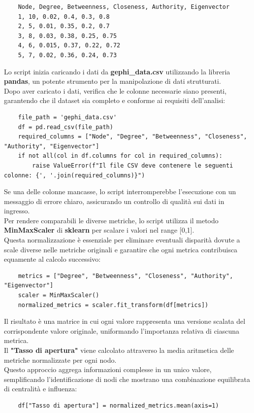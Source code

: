 \documentclass[12pt]{article}
\begin{document}
	\begin{lstlisting}
	Node, Degree, Betweenness, Closeness, Authority, Eigenvector
	1, 10, 0.02, 0.4, 0.3, 0.8
	2, 5, 0.01, 0.35, 0.2, 0.7
	3, 8, 0.03, 0.38, 0.25, 0.75
	4, 6, 0.015, 0.37, 0.22, 0.72
	5, 7, 0.02, 0.36, 0.24, 0.73
	\end{lstlisting}
	Lo script inizia caricando i dati da \textbf{gephi\_data.csv} utilizzando la libreria \textbf{pandas}, un potente strumento per la manipolazione di dati strutturati.\\ 
	Dopo aver caricato i dati, verifica che le colonne necessarie siano presenti, garantendo che il dataset sia completo e conforme ai requisiti dell'analisi:
	\begin{lstlisting}
	file_path = 'gephi_data.csv'
	df = pd.read_csv(file_path)
	required_columns = ["Node", "Degree", "Betweenness", "Closeness", "Authority", "Eigenvector"]
	if not all(col in df.columns for col in required_columns):
		raise ValueError(f"Il file CSV deve contenere le seguenti colonne: {', '.join(required_columns)}")
	\end{lstlisting}
	Se una delle colonne mancasse, lo script interromperebbe l'esecuzione con un messaggio di errore chiaro, assicurando un controllo di qualità sui dati in ingresso.\\
	Per rendere comparabili le diverse metriche, lo script utilizza il metodo \textbf{MinMaxScaler} di \textbf{sklearn} per scalare i valori nel range [0,1].\\
	Questa normalizzazione è essenziale per eliminare eventuali disparità dovute a scale diverse nelle metriche originali e garantire che ogni metrica contribuisca equamente al calcolo successivo:
	\begin{lstlisting}
	metrics = ["Degree", "Betweenness", "Closeness", "Authority", "Eigenvector"]
	scaler = MinMaxScaler()
	normalized_metrics = scaler.fit_transform(df[metrics])
	\end{lstlisting}
	Il risultato è una matrice in cui ogni valore rappresenta una versione scalata del corrispondente valore originale, uniformando l'importanza relativa di ciascuna metrica.\\
	Il \textbf{"Tasso di apertura"} viene calcolato attraverso la media aritmetica delle metriche normalizzate per ogni nodo.\\
	Questo approccio aggrega informazioni complesse in un unico valore, semplificando l'identificazione di nodi che mostrano una combinazione equilibrata di centralità e influenza:
	\begin{lstlisting}
	df["Tasso di apertura"] = normalized_metrics.mean(axis=1)
	\end{lstlisting}
\end{document}
